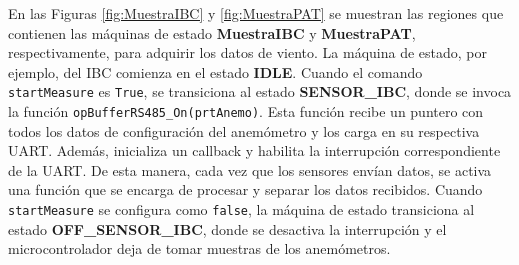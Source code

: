 En las Figuras \ref{fig:MuestraIBC} y \ref{fig:MuestraPAT} se muestran las regiones que contienen las máquinas de estado \textbf{MuestraIBC} y \textbf{MuestraPAT}, respectivamente, para adquirir los datos de viento. La máquina de estado, por ejemplo, del IBC comienza en el estado \textbf{IDLE}. Cuando el comando \texttt{startMeasure} es \texttt{True}, se transiciona al estado \textbf{SENSOR\_IBC}, donde se invoca la función \texttt{opBufferRS485\_On(prtAnemo)}. Esta función recibe un puntero con todos los datos de configuración del anemómetro y los carga en su respectiva UART. Además, inicializa un callback y habilita la interrupción correspondiente de la UART. De esta manera, cada vez que los sensores envían datos, se activa una función que se encarga de procesar y separar los datos recibidos. Cuando \texttt{startMeasure} se configura como \texttt{false}, la máquina de estado transiciona al estado \textbf{OFF\_SENSOR\_IBC}, donde se desactiva la interrupción y el microcontrolador deja de tomar muestras de los anemómetros.

